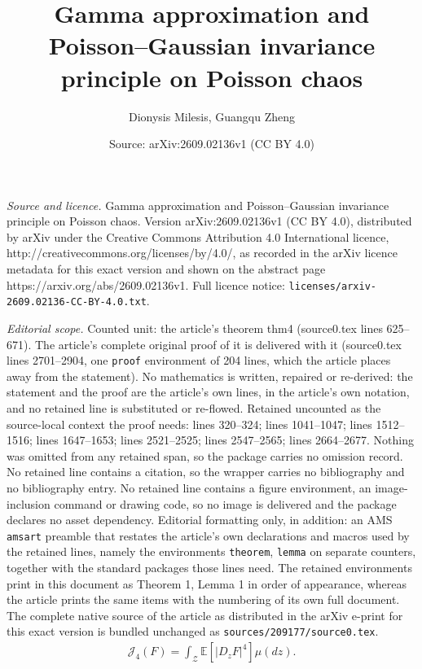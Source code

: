 \documentclass[10pt,a4paper]{amsart}
\title{Gamma approximation and Poisson--Gaussian invariance principle on Poisson chaos}
\author{Dionysis Milesis, Guangqu Zheng}
\date{Source: arXiv:2609.02136v1 (CC BY 4.0)}
\newcommand{\E}{\mathbb{E}}
\newcommand{\Jfour}{\mathcal J_4}
\newcommand{\cZ}{\mathcal{Z}}
\newcommand{\dd}{d}
\begin{document}
\maketitle

\noindent\emph{Source and licence.} Gamma approximation and Poisson--Gaussian invariance principle on Poisson chaos. Version arXiv:2609.02136v1 (CC BY 4.0), distributed by arXiv under the Creative Commons Attribution 4.0 International licence, http://creativecommons.org/licenses/by/4.0/, as recorded in the arXiv licence metadata for this exact version and shown on the abstract page https://arxiv.org/abs/2609.02136v1. Full licence notice: \texttt{licenses/arxiv-2609.02136-CC-BY-4.0.txt}.\par\smallskip

\noindent\textit{Editorial scope.} Counted unit: the article's theorem thm4 (source0.tex lines 625--671). The article's complete original proof of it is delivered with it (source0.tex lines 2701--2904, one \texttt{proof} environment of 204 lines, which the article places away from the statement). No mathematics is written, repaired or re-derived: the statement and the proof are the article's own lines, in the article's own notation, and no retained line is substituted or re-flowed.  Retained uncounted as the source-local context the proof needs: lines 320--324; lines 1041--1047; lines 1512--1516; lines 1647--1653; lines 2521--2525; lines 2547--2565; lines 2664--2677.  Nothing was omitted from any retained span, so the package carries no omission record.  No retained line contains a citation, so the wrapper carries no bibliography and no bibliography entry.  No retained line contains a figure environment, an image-inclusion command or drawing code, so no image is delivered and the package declares no asset dependency.  Editorial formatting only, in addition: an AMS \texttt{amsart} preamble that restates the article's own declarations and macros used by the retained lines, namely the environments \texttt{theorem}, \texttt{lemma} on separate counters, together with the standard packages those lines need.  The retained environments print in this document as Theorem 1, Lemma 1 in order of appearance, whereas the article prints the same items with the numbering of its own full document.  The complete native source of the article as distributed in the arXiv e-print for this exact version is bundled unchanged as \texttt{sources/209177/source0.tex}.
\begin{align} \label{J4F}
\Jfour(F)
=
\int_\cZ\E[|D_zF|^4]\mu(\dd z).
\end{align}
\end{document}
